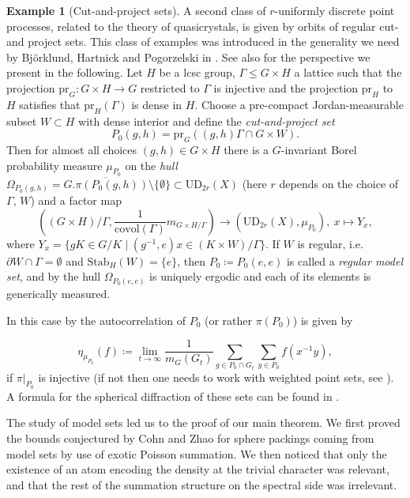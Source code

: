 \documentclass[12pt,reqno,a4paper]{amsart}
\theoremstyle{theorem}
\theoremstyle{definition}
\newtheorem{example}[theorem]{Example}
\numberwithin{theorem}{section}
\numberwithin{equation}{section}
\newcommand{\UD}{\mathrm{UD}}
\begin{document}
\begin{example}[Cut-and-project sets]\label{e:cut-and-project sets}
A second class of $r$-uniformly discrete point processes, related to the theory of quasicrystals, is given by orbits of regular cut-and project sets. This class of examples was introduced in the generality we need by Björklund, Hartnick and Pogorzelski in \cite{BHP1, BHP2, BHP3}. See also \cite[Section 7]{BHSiegelTransform} for the perspective we present in the following.
Let $H$ be a lcsc group, $\Gamma\leq G\times H$ a lattice such that the projection $\mathrm{pr}_G:G\times H\to G$ restricted to $\Gamma$ is injective and the projection $\mathrm{pr}_H$ to $H$ satisfies that $\mathrm{pr}_H(\Gamma)$ is dense in $H$. Choose a pre-compact Jordan-measurable subset $W\subset H$ with dense interior and define the \emph{cut-and-project set} \[P_0(g, h) = \mathrm{pr}_G((g,h)\Gamma\cap G\times W).\]
Then for almost all choices $(g, h)\in G\times H$ there is a $G$-invariant Borel probability measure $\mu_{P_0}$ on the \emph{hull} $\Omega_{P_0(g,h)}=\overline{G.\pi(P_0(g,h))}\setminus \{\emptyset\}\subset\UD_{2r}(X)$ (here $r$ depends on the choice of $\Gamma$, $W$) and a factor map
\[((G\times H)/\Gamma,\frac{1}{\mathrm{covol}(\Gamma)}m_{G\times H/\Gamma})\to (\UD_{2r}(X),\mu_{P_0}),\  x\mapsto Y_x,\]
where $Y_x= \{gK\in G/K\mid (g^{-1},e)x\in (K\times W)/\Gamma\}$.
If $W$ is regular, i.e. $\partial W \cap \Gamma = \emptyset$ and $\mathrm{Stab}_H(W)=\{e\}$, then $P_0\coloneqq P_0(e,e)$ is called a \emph{regular model set}, and by \cite{BHP1} the hull $\Omega_{P_0(e,e)}$ is uniquely ergodic and each of its elements is generically measured.

In this case by \cite{BHP1} the autocorrelation of $P_0$ (or rather $\pi(P_0)$) is given by

\[\eta_{\mu_{P_0}}(f)\coloneqq \lim_{t\to \infty}\frac{1}{m_G(G_t)}\sum_{g\in P_0\cap G_t}\sum_{y\in P_0} f(x^{-1}y),\]
if $\pi|_{P_0}$ is injective (if not then one needs to work with weighted point sets, see \cite{BHP2}).
A formula for the spherical diffraction of these sets can be found in \cite{BHP3}.
\end{example}

The study of model sets led us to the proof of our main theorem. We first proved the bounds conjectured by Cohn and Zhao for sphere packings coming from model sets by use of exotic Poisson summation. We then noticed that only the existence of an atom encoding the density at the trivial character was relevant, and that the rest of the summation structure on the spectral side was irrelevant.
\end{document}

